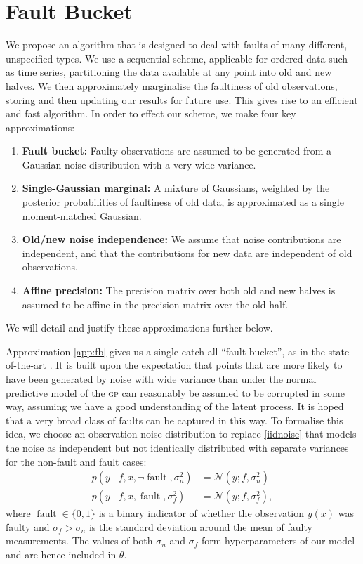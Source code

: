 \documentclass[twoside]{article}
\newcommand{\deq}{=}
\newcommand{\given}{\!\ensuremath{\mid}\!}
\newcommand{\cm}[1]{\ensuremath{\mathcal{#1}}}
\newcommand{\acro}[1]{\textsc{\MakeLowercase{#1}}}
\DeclareMathOperator{\fault}{fault}
\begin{document}
\section{Fault Bucket}\label{bucket}

We propose an algorithm that is designed to deal with faults of many different, unspecified types. We use a sequential scheme, applicable for ordered data such as time series, partitioning the data available at any point into old and new halves.  We then approximately marginalise the faultiness of old observations, storing and then updating our results for future use. This gives rise to an efficient and fast algorithm. In order to effect our scheme, we make four key approximations:
\begin{enumerate}
 \item \label{app:fb} {\bf Fault bucket:} Faulty observations are assumed to be generated from a Gaussian noise distribution with a very wide variance.
\item \label{app:single_gaussian} {\bf Single-Gaussian marginal:} A mixture of Gaussians, weighted by the posterior probabilities of faultiness of old data, is approximated as a single moment-matched Gaussian.
\item \label{app:independence} {\bf Old/new noise independence:} We assume that noise contributions are independent, and that the contributions for new data are independent of old observations.
\item \label{app:affine} {\bf Affine precision:} The precision matrix over both old and new halves is assumed to be affine in the precision matrix over the old half.
\end{enumerate}
We will detail and justify these approximations further below.

Approximation \ref{app:fb} gives us a single catch-all ``fault bucket'', as in the state-of-the-art \cite{Dereszynski}. It is built upon the expectation that points that are more likely to have been generated by noise with wide variance than under the normal
predictive model of the \acro{gp} can reasonably be assumed to
be corrupted in some way, assuming we have a good understanding of the
latent process. It is hoped that a very broad class of faults can be
captured in this way. 
To formalise this idea, we choose an observation noise distribution to
replace \eqref{iidnoise} that models the noise as independent
but not identically distributed with separate variances for the
non-fault and fault cases:
\begin{align*}
 p(y \given f, x, \neg\fault, \sigma_n^2)
 &
 \deq
 \cm{N}(y; f, \sigma_n^2)
 \\
 p(y \given f, x, \fault, \sigma_f^2)
 &
 \deq
 \cm{N}(y; f, \sigma_f^2),
\end{align*}
where $\fault \in \lbrace 0, 1 \rbrace$ is a binary indicator of
whether the observation $y(x)$ was faulty and $\sigma_f > \sigma_n$ is
the standard deviation around the mean of faulty measurements.  The
values of both $\sigma_n$ and $\sigma_f$ form hyperparameters of our
model and are hence included in $\theta$.
\end{document}
